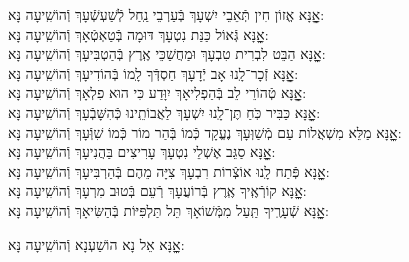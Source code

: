 \documentclass[twoside, openany, parskip=half, 11pt]{book}
\begin{document}
\begin{small}
	אׇׇׇׇָנָּא אֱזוֹן חִין תְּֿאֵבֵי יִשְׁעָךְ בְּֿעַרְבֵי נַֽחַל לְֿשַׁעְשְֿׁעָךְ \hfill וְֿהוֹשִֽׁיעָה נָּא:\\
	אׇׇׇׇָנָּא גְּֿאוֹל כַּנַּת נִטְעָךְ דּוּמָה בְּֿטַאְטְֿאָךְ \hfill וְֿהוֹשִֽׁיעָה נָּא:\\
	אׇׇׇׇָנָּא הַבֵּט לִבְרִית טִבְעָךְ וּמַחֲשַׁכֵּי אֶֽרֶץ בְּֿהַטְבִּיעָךְ \hfill וְֿהוֹשִֽׁיעָה נָּא:\\
	אׇׇׇׇָנָּא זְֿכָר־לָֽנוּ אָב יְֿדָעָךְ חַסְדְּֿךָ לָֽמוֹ בְּֿהוֹדִיעָךְ \hfill וְֿהוֹשִֽׁיעָה נָּא:\\
	אׇׇׇׇָנָּא טְֿהוֹרֵי לֵב בְּֿהַפְלִיאָךְ יִוָּדַע כִּי הוּא פִלְאָךְ \hfill וְֿהוֹשִֽׁיעָה נָּא:\\
	אׇׇׇׇָנָּא כַּבִּיר כֹּֽחַ תֶּן־לָֽנוּ יִשְׁעָךְ לַאֲבוֹתֵֽינוּ כְּֿהִשָּׁבְֿעָךְ \hfill וְֿהוֹשִֽׁיעָה נָּא:\\
	אׇׇׇׇָנָּא מַלֵּא מִשְׁאֲלוֹת עַם מְֿשַׁוְּעָךְ נֶעֱקָד כְּֿמוֹ בְּֿהַר מוֹר כְּֿמוֹ שִׁוְּֿעָךְ \hfill וְֿהוֹשִֽׁיעָה נָּא:\\
	אׇׇׇׇָנָּא סַגֵּב אֶשְׁלֵי נִטְעָךְ עָרִיצִים בַּהֲנִיעָךְ \hfill וְֿהוֹשִֽׁיעָה נָּא:\\
	אׇׇׇׇָנָּא פְּֿתַח לָֽנוּ אוֹצְֿרוֹת רִבְעָךְ צִיָּה מֵהֶם בְּֿהַרְבִּיעָךְ \hfill וְֿהוֹשִֽׁיעָה נָּא:\\
	אׇׇׇׇָנָּא קוֹרְֿאֶֽיךָ אֶֽרֶץ בְּֿרוֹעֲעָךְ רְֿעֵם בְּֿטוּב מִרְעָךְ \hfill וְֿהוֹשִֽׁיעָה נָּא:\\
	אׇׇׇׇָנָּא שְֿׁעָרֶֽיךָ תַּֽעַל מִמְּֿשׁוֹאָךְ תֵּל תַּלְפִּיּוֹת בְּֿהַשִּׂיאָךְ \hfill וְֿהוֹשִֽׁיעָה נָּא:
	
\end{small}

\begin{large}
	\shatzvkahal
	אׇׇׇׇָנָּא אֵל נָא הוֹשַׁעְנָא וְֿהוֹשִֽׁיעָה נָּא:
	
\end{large}
\end{document}
